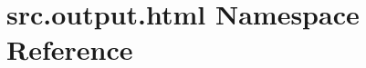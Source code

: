 \hypertarget{namespacesrc_1_1output_1_1html}{\section{src.\+output.\+html Namespace Reference}
\label{namespacesrc_1_1output_1_1html}
}
